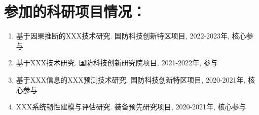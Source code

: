 \section*{参加的科研项目情况：}
\begin{enumerate}
\item 基于因果推断的XXX技术研究. 国防科技创新特区项目, 2022-2023年, 核心参与
\item 基于XXX技术研究. 国防科技创新研究院项目, 2021-2022年, 参与
\item 基于XXX信息的XXX预测技术研究. 国防科技创新特区项目, 2020-2021年, 核心参与
\item XXX系统韧性建模与评估研究. 装备预先研究项目, 2020-2021年, 核心参与
\end{enumerate}

\cleardoublepage[plain]%
